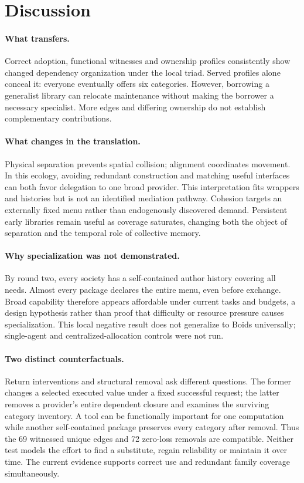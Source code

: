 \documentclass[sigconf,anonymous]{aamas}
\begin{document}
\section{Discussion}\label{sec:discussion}
\paragraph{What transfers.} Correct adoption, functional witnesses and ownership profiles consistently show changed dependency organization under the local triad. Served profiles alone conceal it: everyone eventually offers six categories. However, borrowing a generalist library can relocate maintenance without making the borrower a necessary specialist. More edges and differing ownership do not establish complementary contributions.

\paragraph{What changes in the translation.} Physical separation prevents spatial collision; alignment coordinates movement. In this ecology, avoiding redundant construction and matching useful interfaces can both favor delegation to one broad provider. This interpretation fits wrappers and histories but is not an identified mediation pathway. Cohesion targets an externally fixed menu rather than endogenously discovered demand. Persistent early libraries remain useful as coverage saturates, changing both the object of separation and the temporal role of collective memory.

\paragraph{Why specialization was not demonstrated.} By round two, every society has a self-contained author history covering all needs. Almost every package declares the entire menu, even before exchange. Broad capability therefore appears affordable under current tasks and budgets, a design hypothesis rather than proof that difficulty or resource pressure causes specialization. This local negative result does not generalize to Boids universally; single-agent and centralized-allocation controls were not run.

\paragraph{Two distinct counterfactuals.} Return interventions and structural removal ask different questions. The former changes a selected executed value under a fixed successful request; the latter removes a provider's entire dependent closure and examines the surviving category inventory. A tool can be functionally important for one computation while another self-contained package preserves every category after removal. Thus the 69 witnessed unique edges and 72 zero-loss removals are compatible. Neither test models the effort to find a substitute, regain reliability or maintain it over time. The current evidence supports correct use and redundant family coverage simultaneously.
\end{document}
